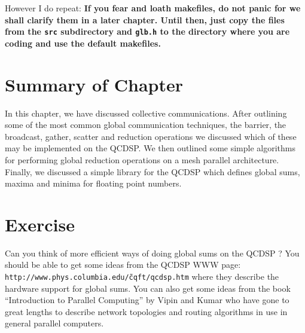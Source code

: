 However I do repeat: {\bf If you fear and loath makefiles, do not
panic for we shall clarify them in a later chapter. Until then, just
copy the files from the {\tt src} subdirectory and {\tt glb.h} to the
directory where you are coding and use the default makefiles.}

\section{Summary of Chapter}
In this chapter, we have discussed collective communications.
After outlining some of the most common global communication techniques,
the barrier, the broadcast, gather, scatter and reduction operations
we discussed which of these may be implemented on the QCDSP. 
We then outlined some simple algorithms for performing global reduction
operations on a mesh parallel architecture. Finally, we discussed a
simple library for the QCDSP which defines global sums, maxima and minima
for floating point numbers.

\section{Exercise}
Can you think of more efficient ways of doing global sums on the 
QCDSP ? You should be able to get some ideas from the QCDSP WWW page:
{\tt http://www.phys.columbia.edu/\~cqft/qcdsp.htm} where they describe
the hardware support for global sums. You can also get some ideas
from the book ``Introduction to Parallel Computing'' by Vipin and Kumar
who have gone to great lengths to describe network topologies and 
routing algorithms in use in general parallel computers.


